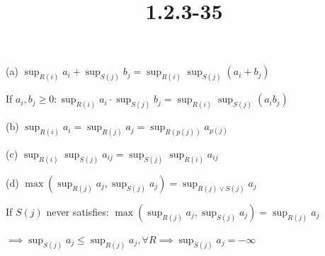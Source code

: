 \documentclass{article}
\title{1.2.3-35}
\begin{document}
\maketitle

(a) \( \sup_{R(i)}a_i + \sup_{S(j)}b_j = \sup_{R(i)}\sup_{S(j)}(a_i + b_j) \)

If \( a_i, b_j \geq 0: \sup_{R(i)}a_i \cdot \sup_{S(j)}b_j = \sup_{R(i)}\sup_{S(j)}(a_ib_j) \)

(b) \( \sup_{R(i)} a_i = \sup_{R(j)} a_j = \sup_{R(p(j))} a_{p(j)} \)

(c) \( \sup_{R(i)}\sup_{S(j)} a_{ij} = \sup_{S(j)} \sup_{R(i)} a_{ij} \)

(d) \( \max(\sup_{R(j)} a_j, \sup_{S(j)} a_j ) = \sup_{R(j) \lor S(j)} a_j \)

If \( S(j) \) never satisfies: \( \max(\sup_{R(j)} a_j, \sup_{S(j)} a_j ) = \sup_{R(j)} a_j \)

\( \implies \sup_{S(j)} a_j \leq \sup_{R(j)} a_j, \forall R \implies \sup_{S(j)} a_j = -\infty \)
\end{document}

